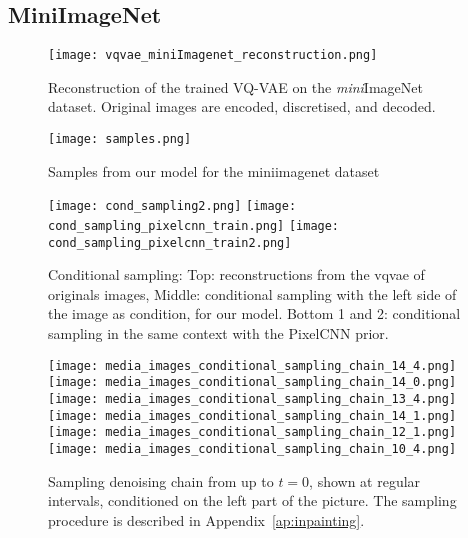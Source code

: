 \documentclass{article}
\theoremstyle{plain}
\theoremstyle{definition}
\theoremstyle{remark}
\begin{document}
\subsection{MiniImageNet}
\begin{figure}[!htb]
    \centering
    \texttt{[image: vqvae\_miniImagenet\_reconstruction.png]}
    \caption{Reconstruction of the trained VQ-VAE on the \textit{mini}ImageNet dataset. Original images are encoded, discretised, and decoded.}
    \label{fig:miniimagenet_vqvae}
\end{figure}

\begin{figure}
    \centering
    \texttt{[image: samples.png]}
    \caption{Samples from our model for the miniimagenet dataset}
    \label{fig:miniimagenet_prior_ours2}
\end{figure}


\begin{figure}
    \centering
    \texttt{[image: cond\_sampling2.png]}
    \texttt{[image: cond\_sampling\_pixelcnn\_train.png]}
    \texttt{[image: cond\_sampling\_pixelcnn\_train2.png]}
    \caption{Conditional sampling: Top: reconstructions from the vqvae of originals images, Middle: conditional sampling with the left side of the image as condition, for our model. Bottom 1 and 2: conditional sampling in the same context with the PixelCNN prior.}
    \label{fig:miniimagenet_prior_ours_conditional2}
\end{figure}


\begin{figure}
    \centering
    \texttt{[image: media\_images\_conditional\_sampling\_chain\_14\_4.png]}
    \texttt{[image: media\_images\_conditional\_sampling\_chain\_14\_0.png]}
    \texttt{[image: media\_images\_conditional\_sampling\_chain\_13\_4.png]}
    \texttt{[image: media\_images\_conditional\_sampling\_chain\_14\_1.png]}
    \texttt{[image: media\_images\_conditional\_sampling\_chain\_12\_1.png]}
    \texttt{[image: media\_images\_conditional\_sampling\_chain\_10\_4.png]}
    \caption{Sampling denoising chain from up to $t=0$, shown at regular intervals, conditioned on the left part of the picture. The sampling procedure is described in Appendix~\ref{ap:inpainting}.}
    \label{fig:miniimagenet_prior_ours_chain2}
\end{figure}

\iffalse
\begin{figure}
    \centering
    \texttt{[image: cond\_samples2.png]}
    \texttt{[image: cond\_sampling\_pixelcnn\_train.png]}
    \texttt{[image: cond\_sampling\_pixelcnn\_train2.png]}
    \caption{Conditional sampling: Top: reconstructions from the VQ-VAE of originals images, Middle: conditional sampling with the left side of the image as condition, for our model. Bottom 1 and 2: conditional sampling in the same context with the PixelCNN prior.}
    \label{fig:miniimagenet_prior_ours_conditional3}
\end{figure}
\fi
\end{document}
